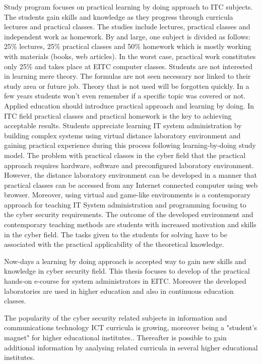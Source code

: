 Study program focuses on practical learning by doing approach to ITC subjects. The students gain skills and knowledge as they progress through curricula lectures and practical classes. The studies include lectures, practical classes and independent work as homework. By and large, one subject is divided as follows: 25\% lectures, 25\% practical classes and 50\% homework which is mostly working with materials (books, web articles). In the worst case, practical work constitutes only 25\% and takes place at \gls{EITC} computer classes. Students are not interested in learning mere theory. The formulas are not seen necessary nor linked to their study area or future job. Theory that is not used will be forgotten quickly. In a few years students won't even remember if a specific topic was covered or not. Applied education should introduce practical approach and learning by doing. In ITC field practical classes and practical homework is the key to achieving acceptable results. Students appreciate learning IT system administration by building complex systems using virtual distance laboratory environment and gaining practical experience during this process following learning-by-doing study model.
The problem with practical classes in the cyber field that the practical approach requires hardware, software and preconfigured laboratory environment. However, the  distance laboratory environment can be developed in a manner  that practical classes can be accessed from any Internet connected computer using web browser. Moreover, using virtual and game-like environments is a contemporary approach for teaching IT System administration and programming focusing to the cyber security requirements. The outcome of the developed environment and contemporary teaching methods are students with increased motivation and skills in the cyber field. The tasks given to the students for solving have to be associated with the practical applicability of the theoretical knowledge.






Now-days a learning by doing approach is accepted way to gain new skills and knowledge in cyber security field. This thesis focuses to develop of the practical hands-on e-course for system administrators in \gls{EITC}. Moreover the developed laboratories are used in higher education and also in continuous education classes.


The popularity of the cyber security related subjects in information and communications technology \gls{ICT} curricula is growing, moreover being a "student's magnet" for higher educational institutes.\citep{CyberIsHot}. Thereafter is possible to gain additional information by analysing related curricula in several higher educational institutes.

